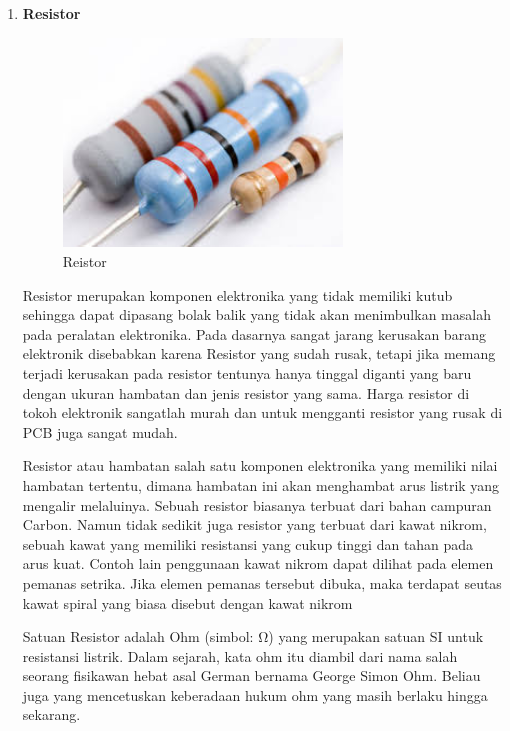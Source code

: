 \begin{enumerate}
\item \textbf{Resistor}
\begin{figure}[H]
\centering
\includegraphics[width=0.7\textwidth]{figures/resistor3.jpg}
\caption{Reistor}
\label{print}
\end{figure}

\par Resistor merupakan komponen elektronika yang tidak memiliki kutub sehingga dapat dipasang bolak balik yang tidak akan menimbulkan masalah pada peralatan elektronika. Pada dasarnya sangat jarang kerusakan barang elektronik disebabkan karena Resistor yang sudah rusak, tetapi jika memang terjadi kerusakan pada resistor tentunya hanya tinggal diganti yang baru dengan ukuran hambatan dan jenis resistor yang sama. Harga resistor di tokoh elektronik sangatlah murah dan untuk mengganti resistor yang rusak di PCB juga sangat mudah.

\par Resistor atau hambatan  salah satu komponen elektronika yang memiliki nilai hambatan tertentu, dimana hambatan ini akan menghambat arus listrik yang mengalir melaluinya. Sebuah resistor biasanya terbuat dari bahan campuran Carbon. Namun tidak sedikit juga resistor yang terbuat dari kawat nikrom, sebuah kawat yang memiliki resistansi yang cukup tinggi dan tahan pada arus kuat. Contoh lain penggunaan kawat nikrom dapat dilihat pada elemen pemanas setrika. Jika elemen pemanas tersebut dibuka, maka terdapat seutas kawat spiral yang biasa disebut dengan kawat nikrom

\par Satuan Resistor adalah Ohm (simbol: Ω) yang merupakan satuan SI untuk resistansi listrik. Dalam sejarah, kata ohm itu diambil dari nama salah seorang fisikawan hebat asal German bernama George Simon Ohm. Beliau juga yang mencetuskan keberadaan hukum ohm yang masih berlaku hingga sekarang.


\end{enumerate}
